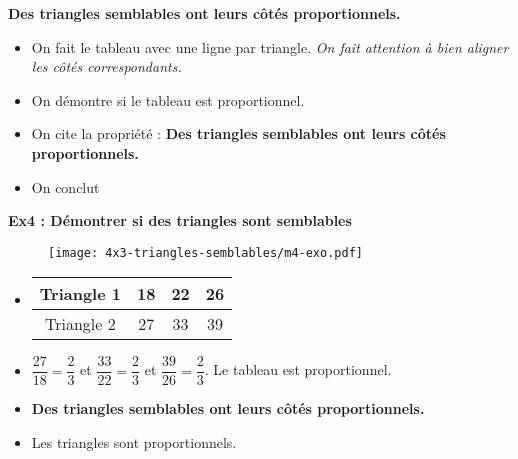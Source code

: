 \textbf{Des triangles semblables ont leurs côtés proportionnels.} 

\begin{itemize}
  \item On fait le tableau avec une ligne par triangle. \textit{On fait attention à bien aligner les côtés correspondants.}
  \item On démontre si le tableau est proportionnel.
  \item On cite la propriété : \textbf{Des triangles semblables ont leurs côtés proportionnels.} 
  \item On conclut
\end{itemize}

\horrule{1px}
\textbf{Ex4 : Démontrer si des triangles sont semblables}

\begin{multicols}{2}
  \begin{figure}[H]
    \centering
    \texttt{[image: 4x3-triangles-semblables/m4-exo.pdf]}
  \end{figure}
  \columnbreak

  \begin{itemize}[label={$\bullet$}]
    \item     
    \begin{tabular}{|c|c|c|c|}
      \hline
      Triangle 1 & 18 & 22 & 26 \\  \hline
      Triangle 2 & 27 & 33 & 39\\  \hline
    \end{tabular}
    \item $\dfrac{27}{18} = \dfrac{2}{3}$ et $\dfrac{33}{22} = \dfrac{2}{3}$ et $\dfrac{39}{26} = \dfrac{2}{3}$. \newline
    Le tableau est proportionnel.
    \item \textbf{Des triangles semblables ont leurs côtés proportionnels.} 
    \item Les triangles sont proportionnels.
  \end{itemize}
\end{multicols}

